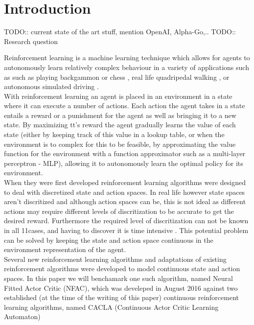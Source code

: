 
\section{Introduction}
TODO:: current state of the art stuff, mention OpenAI, Alpha-Go,..
TODO:: Research question

Reinforcement learning is a machine learning technique which allows for agents to autonomously learn relatively complex behaviour
in a variety of applications such as such as playing backgammon \cite{tesauro2002programming} or chess \cite{baxter1999knightcap},
real life quadripedal walking \cite{kohl2004policy}, or autonomous simulated driving \cite{}. \\

With reinforcement learning an agent is placed in an environment in a state where it can execute a number of actions. Each
action the agent takes in a state entails a reward or a punishment for the agent as well as bringing it to a new state.
By maximizing tt's reward the agent gradually learns the value of each state (either by keeping track of this value in a
lookup table, or when the environment is to complex for this to be feasible, by approximating the value function for the
environment with a function approximator such as a multi-layer perceptron - MLP), allowing it to autonomously learn the optimal policy
for its environment. \\
When they were first developed reinforcement learning algorithms were designed to deal with discretized state and action
spaces. In real life however state spaces aren't discritized and although action spaces can be, this is not ideal as different
actions may require different levels of discritization to be accurate to get the desired reward. Furthermore the required level
of discritization can not be known in all 11cases, and having to discover it is time intensive \cite{van2007reinforcement}. %
This potential problem can be solved by keeping the state and action space continuous in the environment representation of the agent. \\
Several new reinforcement learning algorithms and adaptations of existing reinforcement algorithms were developed to model continuous
state and action spaces. In this paper we will benchamark one such algorithm, named Neural Fitted Actor Critic (NFAC), which was develeped in August 2016 \cite{zimmer2016neural}
against two established (at the time of the writing of this paper) continuous reinforcement learning algorithms, named CACLA (Continuous Actor Critic Learning Automaton)
